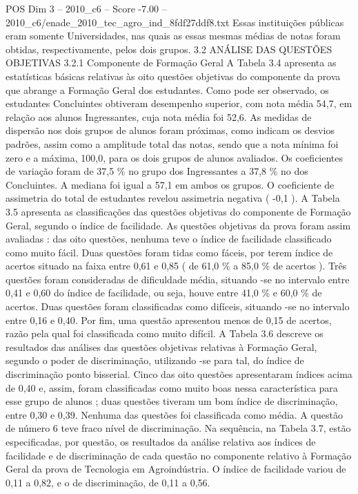 \begin{textsample}{POS Dim 3 – 2010\_c6 – Score -7.00 – 2010\_c6/enade\_2010\_tec\_agro\_ind\_8fdf27ddf8.txt}
Essas instituições públicas eram somente Universidades, nas quais as essas mesmas médias de notas foram obtidas, respectivamente, pelos dois grupos. 3.2 ANÁLISE DAS QUESTÕES OBJETIVAS 3.2.1 Componente de Formação Geral A Tabela 3.4 apresenta as estatísticas básicas relativas às oito questões objetivas do componente da prova que abrange a Formação Geral dos estudantes.
Como pode ser observado, os estudantes Concluintes obtiveram desempenho superior, com nota média 54,7, em relação aos alunos Ingressantes, cuja nota média foi 52,6.
As medidas de dispersão nos dois grupos de alunos foram próximas, como indicam os desvios padrões, assim como a amplitude total das notas, sendo que a nota mínima foi zero e a máxima, 100,0, para os dois grupos de alunos avaliados.
Os coeficientes de variação foram de 37,5 \% no grupo dos Ingressantes a 37,8 \% no dos Concluintes.
A mediana foi igual a 57,1 em ambos os grupos.
O coeficiente de assimetria do total de estudantes revelou assimetria negativa ( -0,1 ).
A Tabela 3.5 apresenta as classificações das questões objetivas do componente de Formação Geral, segundo o índice de facilidade.
As questões objetivas da prova foram assim avaliadas : das oito questões, nenhuma teve o índice de facilidade classificado como muito fácil.
Duas questões foram tidas como fáceis, por terem índice de acertos situado na faixa entre 0,61 e 0,85 ( de 61,0 \% a 85,0 \% de acertos ).
Três questões foram consideradas de dificuldade média, situando -se no intervalo entre 0,41 e 0,60 do índice de facilidade, ou seja, houve entre 41,0 \% e 60,0 \% de acertos.
Duas questões foram classificadas como difíceis, situando -se no intervalo entre 0,16 e 0,40.
Por fim, uma questão apresentou menos de 0,15 de acertos, razão pela qual foi classificada como muito difícil.
A Tabela 3.6 descreve os resultados das análises das questões objetivas relativas à Formação Geral, segundo o poder de discriminação, utilizando -se para tal, do índice de discriminação ponto bisserial.
Cinco das oito questões apresentaram índices acima de 0,40 e, assim, foram classificadas como muito boas nessa característica para esse grupo de alunos ; duas questões tiveram um bom índice de discriminação, entre 0,30 e 0,39.
Nenhuma das questões foi classificada como média.
A questão de número 6 teve fraco nível de discriminação.
Na sequência, na Tabela 3.7, estão especificadas, por questão, os resultados da análise relativa aos índices de facilidade e de discriminação de cada questão no componente relativo à Formação Geral da prova de Tecnologia em Agroindústria.
O índice de facilidade variou de 0,11 a 0,82, e o de discriminação, de 0,11 a 0,56.

\end{textsample}
